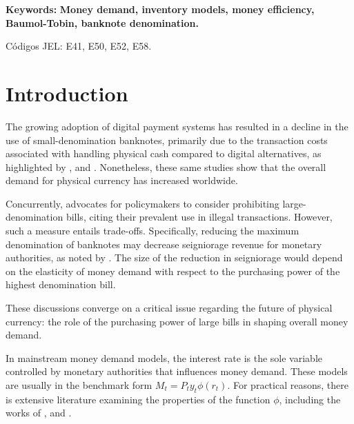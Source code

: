 \documentclass[12pt]{article}
\begin{document}
\vspace{0.5cm}
\noindent
\textbf{Keywords:} \textbf{Money demand, inventory models, money efficiency, Baumol-Tobin, banknote denomination.}

\vspace{1cm}

Códigos JEL: E41, E50, E52, E58.

\newpage

\doublespacing

\setcounter{page}{0}

\section{Introduction } \label{intro}

The growing adoption of digital payment systems has resulted in a decline in the use of small-denomination banknotes, primarily due to the transaction costs associated with handling physical cash compared to digital alternatives, as highlighted by \cite{Amromin2009}, \cite{payment_wang_2016} and \cite{cash_chen_2019}. Nonetheless, these same studies show that the overall demand for physical currency has increased worldwide.

Concurrently, \cite{rogoff2016} advocates for policymakers to consider prohibiting large-denomination bills, citing their prevalent use in illegal transactions. However, such a measure entails trade-offs. Specifically, reducing the maximum denomination of banknotes may decrease seigniorage revenue for monetary authorities, as noted by \cite{Hendrickson2021}. The size of the reduction in seigniorage would depend on the elasticity of money demand with respect to the purchasing power of the highest denomination bill.

These discussions converge on a critical issue regarding the future of physical currency: the role of the purchasing power of large bills in shaping overall money demand.

In mainstream money demand models, the interest rate is the sole variable controlled by monetary authorities that influences money demand. These models are usually in the benchmark form $ M_t = P_t y_t \phi(r_t) $. For practical reasons, there is extensive literature examining the properties of the function $\phi$, including the works of \cite{monetary_freeman_1998}, \cite{stability_lucas_2015} and \cite{Benati2021}. 
\end{document}
